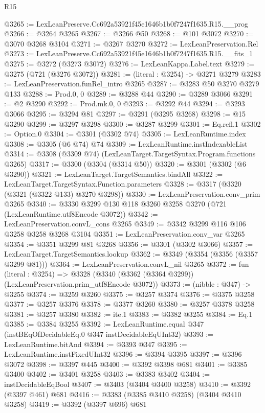 \begin{lexlean}{R15}
\begin{coremodule}
@3265 := LexLeanPreserve.Cc692a53921f45e1646b1b0f7247f1635.R15.__prog
@3266 := @3264 @3265
@3267 := @3266 @50
@3268 := @101 @3072
@3270 := @3070 @3268 @3104
@3271 := @3267 @3270
@3272 := LexLeanPreservation.Rel
@3273 := LexLeanPreserve.Cc692a53921f45e1646b1b0f7247f1635.R15.__fits_1
@3275 := @3272 (@3273 @3072)
@3276 := LexLeanKappa.Label.text
@3279 := @3275 (@721 (@3276 @3072))
@3281 := (literal : @3254) -> @3271 @3279
@3283 := LexLeanPreservation.funRel_intro @3265
@3287 := @3283 @50 @3270 @3279 @133
@3288 := Prod.{0, 0}
@3289 := @3288 @44
@3290 := @3289 @3066
@3291 := @2 @3290
@3292 := Prod.mk.{0, 0}
@3293 := @3292 @44
@3294 := @3293 @3066
@3295 := @3294 @81
@3297 := @3291 (@3295 @3268)
@3298 := @15 @3290
@3299 := @3297 @3298
@3300 := @3287 @3299
@3301 := Eq.refl.{1}
@3302 := Option.{0}
@3304 := @3301 (@3302 @74)
@3305 := LexLeanRuntime.index
@3308 := @3305 (@6 @74) @74
@3309 := LexLeanRuntime.instIndexableList
@3314 := @3308 (@3309 @74) (LexLeanTarget.TargetSyntax.Program.functions @3265)
@3317 := @3300 (@3304 (@3314 @50))
@3320 := @3301 (@3302 (@6 @3290))
@3321 := LexLeanTarget.TargetSemantics.bindAll
@3322 := LexLeanTarget.TargetSyntax.Function.parameters
@3328 := @3317 (@3320 (@3321 (@3322 @133) @3270 @3298))
@3330 := LexLeanPreservation.conv_prim @3265
@3340 := @3330 @3299 @130 @118 @3260 @3258 @3270 (@721 (LexLeanRuntime.utf8Encode @3072))
@3342 := LexLeanPreservation.convL_cons @3265
@3349 := @3342 @3299 @116 @106 @3258 @3258 @3268 @3104
@3351 := LexLeanPreservation.conv_var @3265
@3354 := @3351 @3299 @81 @3268
@3356 := @3301 (@3302 @3066)
@3357 := LexLeanTarget.TargetSemantics.lookup
@3362 := @3349 (@3354 (@3356 (@3357 @3299 @81)))
@3364 := LexLeanPreservation.convL_nil @3265
@3372 := fun (literal : @3254) =>
  @3328 (@3340 (@3362 (@3364 @3299)) (LexLeanPreservation.prim_utf8Encode @3072))
@3373 := (nibble : @347) -> @3255
@3374 := @3259 @3260
@3375 := @3257 @3374
@3376 := @3375 @3258
@3377 := @3257 @3376
@3378 := @3377 @3260
@3380 := @3257 @3378 @3258
@3381 := @3257 @3380
@3382 := ite.{1}
@3383 := @3382 @3255
@3384 := Eq.{1}
@3385 := @3384 @3255
@3392 := LexLeanRuntime.equal @347 (instBEqOfDecidableEq.{0} @347 instDecidableEqUInt32)
@3393 := LexLeanRuntime.bitAnd
@3394 := @3393 @347
@3395 := LexLeanRuntime.instFixedUInt32
@3396 := @3394 @3395
@3397 := @3396 @3072
@3398 := @3397 @445
@3400 := @3392 @3398 @681
@3401 := @3385 @3400
@3402 := @3401 @3258
@3403 := @3383 @3402
@3404 := instDecidableEqBool
@3407 := @3403 (@3404 @3400 @3258)
@3410 := @3392 (@3397 @461) @681
@3416 := @3383 (@3385 @3410 @3258) (@3404 @3410 @3258)
@3419 := @3392 (@3397 @696) @681

\end{coremodule}
\end{lexlean}
